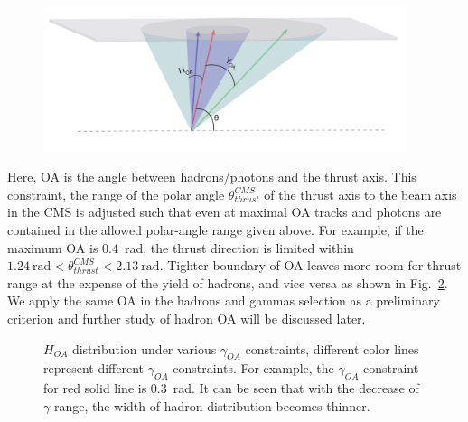 \begin{figure}[H]
  \centering
  \includegraphics[width=0.95\textwidth,natwidth=610,natheight=642]{figure_dataselection/OA.pdf}
  \label{fig:FiducialCut}
\end{figure}
Here, OA is the angle between hadrons/photons and the thrust axis. This constraint, the range of the polar angle $\theta_{thrust}^{CMS}$ of the thrust axis to the beam axis in the CMS is adjusted such that even at maximal OA tracks and photons are contained in the allowed polar-angle range given above. For example, if the maximum OA is $0.4$~rad, the thrust direction is limited within $1.24~\text{rad}<\theta^{CMS}_{thrust}<2.13~\text{rad}$.  Tighter boundary of OA leaves more room for thrust range at the expense of the yield of hadrons, and vice versa as shown in Fig.~\ref{fig:OAs}. We apply the same OA in the hadrons and gammas selection as a preliminary criterion and further study of hadron OA will be discussed later.
\begin{figure}[h]
  \centering     %
  \caption{$H_{OA}$ distribution under various $\gamma_{OA}$ constraints, different color lines represent different $\gamma_{OA}$ constraints. For example, the $\gamma_{OA}$ constraint for red solid line is 0.3~rad. It can be seen that with the decrease of $\gamma$ range, the width of hadron distribution becomes thinner.}
  \label{fig:OAs}
\end{figure}

